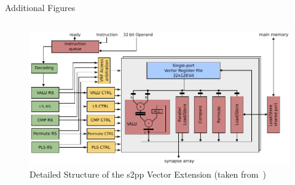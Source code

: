 \documentclass[10pt,aspectratio=169]{beamer}
\begin{document}
\begin{frame}[fragile]{Additional Figures}
\begin{columns}[t]
\begin{column}{.5\textwidth}
\begin{figure}
    \centering
    \includegraphics[width=\textwidth]{pictures/s2pp.pdf}
    \caption{\label{fig:s2pp} Detailed Structure of the s2pp Vector Extension (taken from~\citeauthor{PPU})}
\end{figure}
		\end{column}
	\end{columns}

\end{frame}
\end{document}
